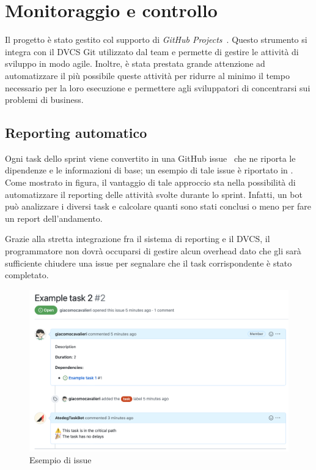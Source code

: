 \chapter{Monitoraggio e controllo}
\label{ch:monitoraggio-e-controllo}

Il progetto è stato gestito col supporto di \emph{GitHub Projects}~\cite{cit:github-projects}. Questo strumento si integra con il DVCS Git utilizzato dal team e permette di gestire le attività di sviluppo in modo agile.
Inoltre, è stata prestata grande attenzione ad automatizzare il più possibile queste attività per ridurre al minimo il tempo necessario per la loro esecuzione e permettere agli sviluppatori di concentrarsi sui problemi di business.

\section{Reporting automatico}
\label{sec:reporting-automatico}

Ogni task dello sprint viene convertito in una GitHub issue~\cite{cit:github-issues} che ne riporta le dipendenze e le informazioni di base; un esempio di tale issue è riportato in . Come mostrato in figura, il vantaggio di tale approccio sta nella possibilità di automatizzare il reporting delle attività svolte durante lo sprint. Infatti, un bot può analizzare i diversi task e calcolare quanti sono stati conclusi o meno per fare un report dell'andamento.

Grazie alla stretta integrazione fra il sistema di reporting e il DVCS, il programmatore non dovrà occuparsi di gestire alcun overhead dato che gli sarà sufficiente chiudere una issue per segnalare che il task corrispondente è stato completato.

\begin{figure}[htp]
  \centering
  \includegraphics[width=\textwidth]{images/task-example.png}
  \caption{Esempio di issue}
  \label{fig:issue-example}
\end{figure}

